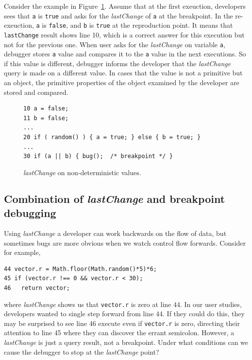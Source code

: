 \documentclass{sig-alternate}
\begin{document}
Consider the example in Figure~\ref{fig:nondeterministic-values}. 
Assume that at the first exeuction, developers sees that \texttt{a} is \texttt{true} and asks
for the \textit{lastChange} of \texttt{a} at the breakpoint. In the re-exeuction, \texttt{a} is \texttt{false},
and \texttt{b} is \texttt{true} at the reproduction point. It means that \texttt{lastChange}
result shows line 10, which is a correct answer for this execution but not for the previous one.
When user asks for the \textit{lastChange} on variable \texttt{a}, debugger stores \texttt{a} value and compares
it to the \texttt{a} value in the next executions. So if this value is different, debugger informs the developer
that the \textit{lastChange} query is made on a different value. In cases that the value is not a primitive but an object,
the primitive properties of the object examined by the developer are stored and compared.

\begin{figure}[htp]
\lstset{basicstyle=\scriptsize}
\begin{lstlisting}[language=myLang, framerule=0pt]
10 a = false;
11 b = false;
...
20 if ( random() ) { a = true; } else { b = true; }
...
30 if (a || b) { bug();  /* breakpoint */ }
\end{lstlisting}
\caption{\textit{lastChange} on non-deterministic values.}
\label{fig:nondeterministic-values}
\end{figure}

\subsection{Combination of {\large\bf\textit{lastChange}} and breakpoint debugging}
\label{sec:pausing}
Using \textit{lastChange} a developer can work backwards on the flow of data, but sometimes bugs are more obvious when
we watch control flow forwards. Consider for example, 

\lstset{basicstyle=\scriptsize}
\begin{lstlisting}[language=myLang, framerule=0pt]
44 vector.r = Math.floor(Math.random()*5)*6;
45 if (vector.r !== 0 && vector.r < 30);
46   return vector;
\end{lstlisting}
where \textit{lastChange} shows us that \texttt{vector.r} is zero at line 44. In our user studies, developers
wanted to single step forward from line 44. If they could do this, they may be surprised to see line 46 execute 
even if \texttt{vector.r} is zero, directing their attention to line 45 where they can discover the errant semicolon.
However, a \textit{lastChange} is just a query result, not a breakpoint. Under what conditions can we 
cause the debugger to stop at the \textit{lastChange} point?
\end{document}
